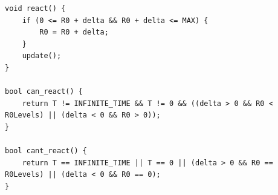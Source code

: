 \documentclass{llncs}
\begin{document}
\begin{subappendices}
\begin{lstlisting}
void react() {
	if (0 <= R0 + delta && R0 + delta <= MAX) {
		R0 = R0 + delta;
	}
	update();
}

bool can_react() {
	return T != INFINITE_TIME && T != 0 && ((delta > 0 && R0 < R0Levels) || (delta < 0 && R0 > 0));
}

bool cant_react() {
	return T == INFINITE_TIME || T == 0 || (delta > 0 && R0 == R0Levels) || (delta < 0 && R0 == 0);
}
\end{lstlisting}


\end{subappendices}
\end{document}
